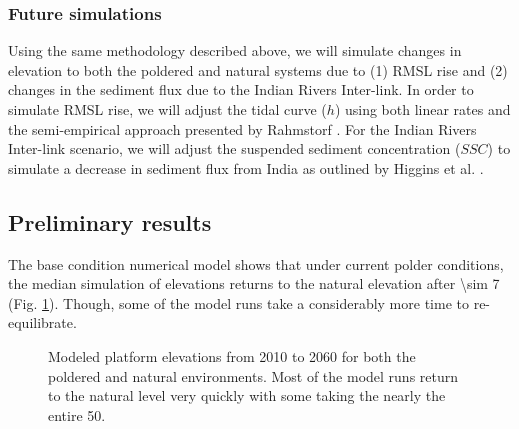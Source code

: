 \documentclass[12pt]{article}
\begin{document}
\subsubsection*{Future simulations}

Using the same methodology described above, we will simulate changes in elevation to both the poldered and natural systems due to (1) RMSL rise and (2) changes in the sediment flux due to the Indian Rivers Inter-link. In order to simulate RMSL rise, we will adjust the tidal curve ($h$) using both linear rates and the semi-empirical approach presented by Rahmstorf \cite{rahmstorfSemiEmpiricalApproachProjecting2007}. For the Indian Rivers Inter-link scenario, we will adjust the suspended sediment concentration ($SSC$) to simulate a decrease in sediment flux from India as outlined by Higgins et al. \cite{higginsRiverLinkingIndia2018}.

\subsection{Preliminary results}

The base condition numerical model shows that under current polder conditions, the median simulation of elevations returns to the natural elevation after \SI{\sim 7}{\year} (Fig. \ref{fig:monte_carlo}). Though, some of the model runs take a considerably more time to re-equilibrate.

\begin{figure}[H]
	\caption[Modeled platform elevations from 2010 to 2060]{\label{fig:monte_carlo} Modeled platform elevations from 2010 to 2060 for both the poldered and natural environments. Most of the model runs return to the natural level very quickly with some taking the nearly the entire \SI{50}{\year}.}
\end{figure}
\end{document}

